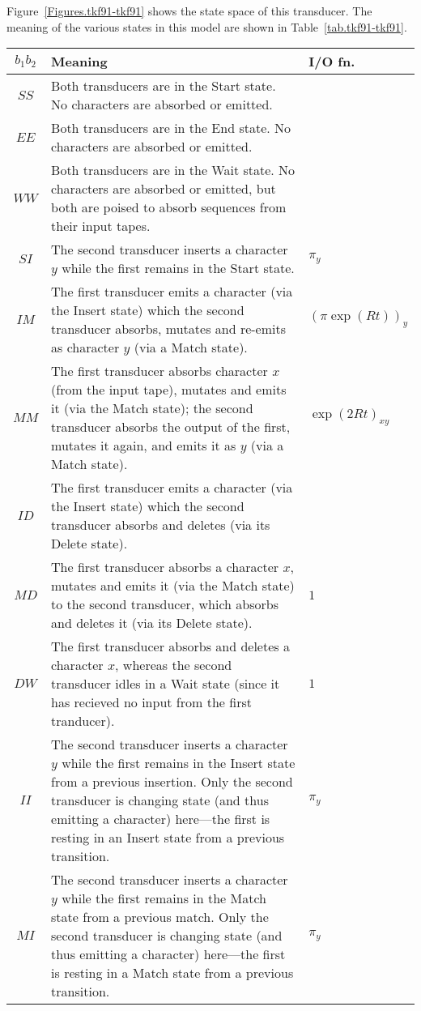 \documentclass{article}
\newcommand{\tabnum}[1]{\ref{tab.#1}}
\newcommand{\tabref}[1]{Table~\tabnum{#1}}
\newcommand{\figref}[1]{Figure~\ref{Figures.#1}}
\begin{document}
\figref{tkf91-tkf91} shows the state space of this transducer.  
The meaning of the various states in this model are shown in \tabref{tkf91-tkf91}.

\begin{table}
\begin{tabular}{c|p{}|p{}}
$b_1 b_2$ & Meaning & I/O fn. \\
\hline
$SS$ & Both transducers are in the Start state.  No characters are absorbed or emitted. &  \\
$EE$ & Both transducers are in the End state.  No characters are  absorbed or emitted. &  \\
$WW$ & Both transducers are in the Wait state.  No characters are absorbed or emitted, but both are poised to absorb sequences from their input tapes. &  \\
$SI$ & The second transducer inserts a character $y$ while the first remains in the Start state.  & $\pi_y$ \\
$IM$ & The first transducer  emits a character (via the Insert state) which the second transducer absorbs, mutates and re-emits as character $y$ (via a Match state).  & $(\pi \exp(Rt))_y$ \\
$MM$ & The first transducer absorbs character $x$ (from the input tape), mutates and emits it (via the Match state); the second transducer absorbs the output of the first, mutates it again, and emits it as $y$ (via a Match state).  & $\exp(2Rt)_{xy}$ \\
$ID$ & The first transducer  emits a character (via the Insert state) which the second transducer absorbs and deletes (via its Delete state).  &  \\
$MD$ & The first transducer  absorbs a character $x$, mutates and emits it (via the Match state) to the second transducer, which absorbs and deletes it (via its Delete state).  & $1$ \\
$DW$ & The first transducer absorbs and deletes a character $x$, whereas the second transducer idles in a Wait state (since it has recieved no input from the first tranducer).   & $1$ \\
$II$ & The second transducer inserts a character $y$ while the first remains in the Insert state from a previous insertion.  Only the second transducer is changing state (and thus emitting a character) here---the first is resting in an Insert state from a previous transition.   & $\pi_y$ \\
$MI$ & The second transducer inserts a character $y$ while the first remains in the Match state from a previous match.  Only the second transducer is changing state (and thus emitting a character) here---the first is resting in a Match state from a previous transition. & $\pi_y$ \\

\end{tabular}
\end{table}
\end{document}
